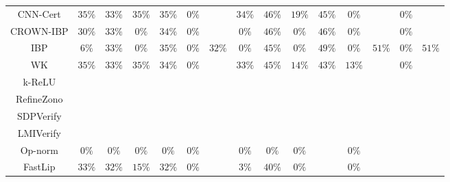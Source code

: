 \begin{table*}
{\begin{tabular}{c|c|c|c|c|c|c|c|c|c|c|c|c|c|c}
     CNN-Cert &        $35\%$ &        $33\%$ &        $35\%$ &        $35\%$ &         $0\%$ &               &        $34\%$ &        $46\%$ &        $19\%$ &        $45\%$ &         $0\%$ &               &         $0\%$ &               \\
    CROWN-IBP &        $30\%$ &        $33\%$ &         $0\%$ &        $34\%$ &         $0\%$ &               &         $0\%$ &        $46\%$ &         $0\%$ &        $46\%$ &         $0\%$ &               &         $0\%$ &               \\
          IBP &         $6\%$ &        $33\%$ &         $0\%$ &        $35\%$ &         $0\%$ &        $32\%$ &         $0\%$ &        $45\%$ &         $0\%$ &        $49\%$ &         $0\%$ &        $51\%$ &         $0\%$ &        $51\%$ \\
           WK &        $35\%$ &        $33\%$ &        $35\%$ &        $34\%$ &         $0\%$ &               &        $33\%$ &        $45\%$ &        $14\%$ &        $43\%$ &        $13\%$ &               &         $0\%$ &               \\
       k-ReLU &               &               &               &               &               &               &               &               &               &               &               &               &               &               \\
   RefineZono &               &               &               &               &               &               &               &               &               &               &               &               &               &               \\
    SDPVerify &               &               &               &               &               &               &               &               &               &               &               &               &               &               \\
    LMIVerify &               &               &               &               &               &               &               &               &               &               &               &               &               &               \\
      Op-norm &         $0\%$ &         $0\%$ &         $0\%$ &         $0\%$ &         $0\%$ &               &         $0\%$ &         $0\%$ &         $0\%$ &               &         $0\%$ &               &               &               \\
      FastLip &        $33\%$ &        $32\%$ &        $15\%$ &        $32\%$ &         $0\%$ &               &         $3\%$ &        $40\%$ &         $0\%$ &               &         $0\%$ &               &               &               \\

\end{tabular}}
\end{table*}
